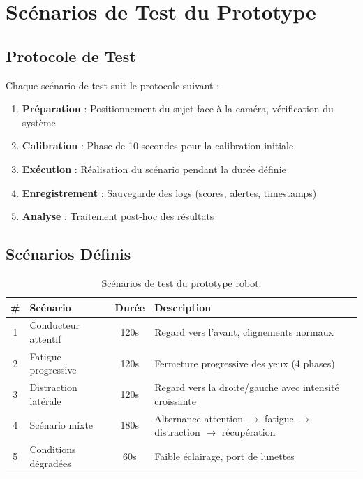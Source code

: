 \section{Scénarios de Test du Prototype}

\subsection{Protocole de Test}

Chaque scénario de test suit le protocole suivant :
\begin{enumerate}[leftmargin=2cm]
    \item \textbf{Préparation} : Positionnement du sujet face à la caméra, vérification du système
    \item \textbf{Calibration} : Phase de 10 secondes pour la calibration initiale
    \item \textbf{Exécution} : Réalisation du scénario pendant la durée définie
    \item \textbf{Enregistrement} : Sauvegarde des logs (scores, alertes, timestamps)
    \item \textbf{Analyse} : Traitement post-hoc des résultats
\end{enumerate}

\subsection{Scénarios Définis}

\begin{table}[H]
\centering
\caption{Scénarios de test du prototype robot.}
\label{tab:robot_scenarios}
\renewcommand{\arraystretch}{1.4}
\begin{tabularx}{\textwidth}{|c|l|c|X|}
\hline
\rowcolor{stellantisblue!15}
\textbf{\#} & \textbf{Scénario} & \textbf{Durée} & \textbf{Description} \\
\hline
1 & Conducteur attentif & 120s & Regard vers l'avant, clignements normaux \\
\hline
2 & Fatigue progressive & 120s & Fermeture progressive des yeux (4 phases) \\
\hline
3 & Distraction latérale & 120s & Regard vers la droite/gauche avec intensité croissante \\
\hline
4 & Scénario mixte & 180s & Alternance attention $\rightarrow$ fatigue $\rightarrow$ distraction $\rightarrow$ récupération \\
\hline
5 & Conditions dégradées & 60s & Faible éclairage, port de lunettes \\
\hline
\end{tabularx}
\end{table}

